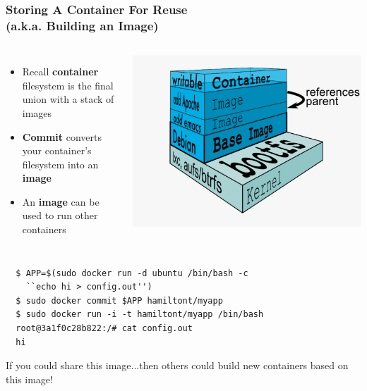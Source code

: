 \documentclass[xcolor=dvipsnames]{beamer}
\begin{document}
\begin{frame}[fragile]
  \frametitle{Storing A Container For Reuse \\(a.k.a. Building an Image)}

  \begin{columns}
    \begin{itemize}\itemsep0em
      \item Recall \textbf{container} filesystem is the final union with a stack of images

      \item \textbf{Commit} converts your container's filesystem into an \textbf{image}

      \item An \textbf{image} can be used to run other containers
    \end{itemize}
    \includegraphics[width=\textwidth]{figures/union-fs.pdf}
  \end{columns} 

  \begin{lstlisting}
  $ APP=$(sudo docker run -d ubuntu /bin/bash -c 
    ``echo hi > config.out'')
  $ sudo docker commit $APP hamiltont/myapp
  $ sudo docker run -i -t hamiltont/myapp /bin/bash
  root@3a1f0c28b822:/# cat config.out
  hi
  \end{lstlisting}

  If you could share this image...then others could build new containers based on this image!

\end{frame}
\end{document}
